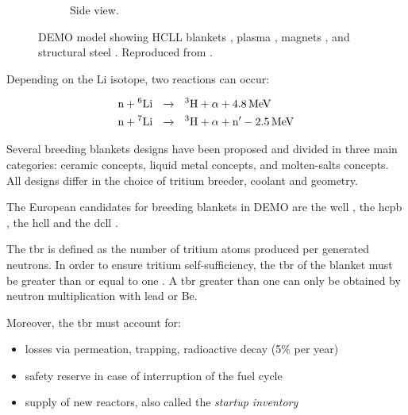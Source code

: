 \begin{figure}
\begin{subfigure}{0.45\linewidth}
        \caption{Side view.}
    \end{subfigure}
    \caption{DEMO model showing HCLL blankets \cruleme[lithiumgreen]{0.3cm}{0.3cm}, plasma \cruleme[plasmapink]{0.3cm}{0.3cm}, magnets \cruleme[magnetred]{0.3cm}{0.3cm}, and structural steel \cruleme[steelgray]{0.3cm}{0.3cm}. Reproduced from \cite{shimwell_multiphysics_2019}.}
\end{figure}

Depending on the \gls{Li} \gls{isotope}, two reactions can occur:

\begin{align}
    \text{n} + \text{\textsuperscript{6}Li}  \ \ &\xrightarrow{} \ \ \text{\textsuperscript{3}H} + \alpha + \SI{4.8}{MeV}\\
    \text{n} + \text{\textsuperscript{7}Li}  \ \ &\xrightarrow{} \ \ \text{\textsuperscript{3}H} + \alpha + \text{n}' - \SI{2.5}{MeV} 
\end{align}

Several \glspl{breeding blanket} designs have been proposed and divided in three main categories: ceramic concepts, liquid metal concepts, and molten-salts concepts.
All designs differ in the choice of tritium breeder, coolant and geometry.

The European candidates for \glspl{breeding blanket} in DEMO are the \gls{wcll} , the \gls{hcpb} , the \gls{hcll}  and the \gls{dcll}  .

The \gls{tbr} is defined as the number of tritium atoms produced per generated neutrons.
In order to ensure tritium self-sufficiency, the \gls{tbr} of the blanket must be greater than or equal to one .
A \gls{tbr} greater than one can only be obtained by neutron multiplication with lead or \gls{Be}.

Moreover, the \gls{tbr} must account for:
\begin{itemize}
    \item losses via \gls{permeation}, \gls{trapping}, radioactive decay (5\% per year)
    \item safety reserve in case of interruption of the fuel cycle
    \item supply of new reactors, also called the \emph{\gls{startup inventory}}
\end{itemize}


